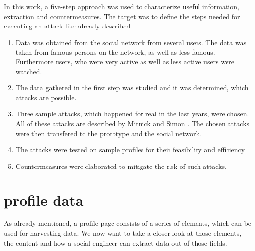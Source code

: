 In this work, a five-step approach was used to characterize useful information,
extraction and countermeasures. The target was to define the steps needed for
executing an attack like already described.

\begin{enumerate}
\item Data was obtained from the \Twitter{} social network from several users.
The data was taken from famous persons on the network, as well as less famous.
Furthermore users, who were very active as well as less active users were
watched.
\item The data gathered in the first step was studied and it was determined, which
attacks are possible. 
\item Three sample attacks, which happened for real in the last years, were
chosen. All of these attacks are described by Mitnick and Simon \cite{mitnick2003}. The chosen
attacks were then transfered to the
prototype and the \Twitter{} social network.
\item The attacks were tested on sample profiles for their feasibility and efficiency
\item Countermeasures were elaborated to mitigate the risk of such attacks.
\end{enumerate}


\section{\Twitter{} profile data}
\label{sec:twitter_profile_data}

As already mentioned, a \Twitter{} profile page consists of a series of
elements, which can be used for harvesting data. We now want to take a closer
look at those elements, the content and how a social engineer can extract data
out of those fields.


